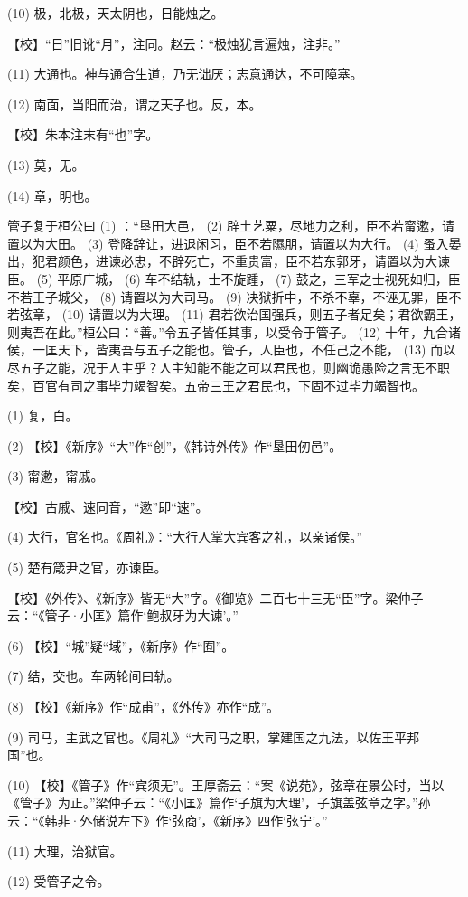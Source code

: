 \documentclass[12pt,UTF8]{ctexbook}
\begin{document}
(10) 极，北极，天太阴也，日能烛之。

【校】“日”旧讹“月”，注同。赵云：“极烛犹言遍烛，注非。”

(11) 大通也。神与通合生道，乃无诎厌；志意通达，不可障塞。

(12) 南面，当阳而治，谓之天子也。反，本。

【校】朱本注末有“也”字。

(13) 莫，无。

(14) 章，明也。

管子复于桓公曰 (1) ：“垦田大邑， (2) 辟土艺粟，尽地力之利，臣不若甯遬，请置以为大田。 (3) 登降辞让，进退闲习，臣不若隰朋，请置以为大行。 (4) 蚤入晏出，犯君颜色，进谏必忠，不辟死亡，不重贵富，臣不若东郭牙，请置以为大谏臣。 (5) 平原广城， (6) 车不结轨，士不旋踵， (7) 鼓之，三军之士视死如归，臣不若王子城父， (8) 请置以为大司马。 (9) 决狱折中，不杀不辜，不诬无罪，臣不若弦章， (10) 请置以为大理。 (11) 君若欲治国强兵，则五子者足矣；君欲霸王，则夷吾在此。”桓公曰：“善。”令五子皆任其事，以受令于管子。 (12) 十年，九合诸侯，一匡天下，皆夷吾与五子之能也。管子，人臣也，不任己之不能， (13) 而以尽五子之能，况于人主乎？人主知能不能之可以君民也，则幽诡愚险之言无不职矣，百官有司之事毕力竭智矣。五帝三王之君民也，下固不过毕力竭智也。

(1) 复，白。

(2) 【校】《新序》“大”作“创”，《韩诗外传》作“垦田仞邑”。

(3) 甯遬，甯戚。

【校】古戚、速同音，“遬”即“速”。

(4) 大行，官名也。《周礼》：“大行人掌大宾客之礼，以亲诸侯。”

(5) 楚有箴尹之官，亦谏臣。

【校】《外传》、《新序》皆无“大”字。《御览》二百七十三无“臣”字。梁仲子云：“《管子·小匡》篇作‘鲍叔牙为大谏’。”

(6) 【校】“城”疑“域”，《新序》作“囿”。

(7) 结，交也。车两轮间曰轨。

(8) 【校】《新序》作“成甫”，《外传》亦作“成”。

(9) 司马，主武之官也。《周礼》“大司马之职，掌建国之九法，以佐王平邦国”也。

(10) 【校】《管子》作“宾须无”。王厚斋云：“案《说苑》，弦章在景公时，当以《管子》为正。”梁仲子云：“《小匡》篇作‘子旗为大理’，子旗盖弦章之字。”孙云：“《韩非·外储说左下》作‘弦商’，《新序》四作‘弦宁’。”

(11) 大理，治狱官。

(12) 受管子之令。
\end{document}

